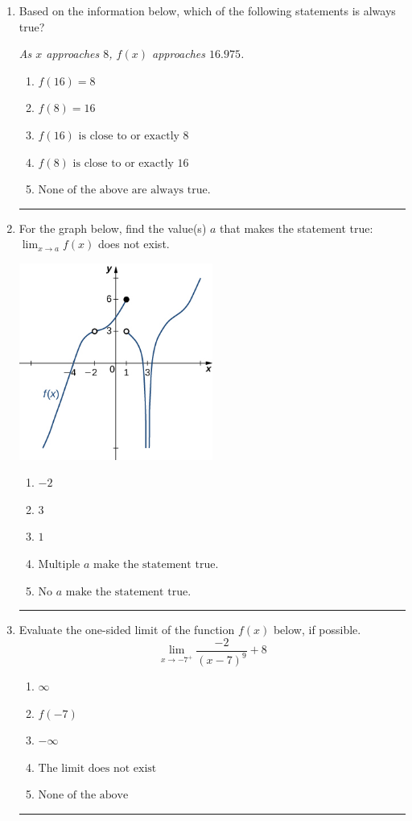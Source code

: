 \documentclass[14pt]{extbook}
\newcommand{\litem}[1]{\item#1\hspace*{-1cm}\rule{\textwidth}{0.4pt}}
\begin{document}
\begin{enumerate}
{\begin{enumerate}[label=\Alph*.]
\end{enumerate} }
\litem{
Based on the information below, which of the following statements is always true?
\begin{center}
    \textit{ As $x$ approaches $8$, $f(x)$ approaches $16.975$. }
\end{center}
\begin{enumerate}[label=\Alph*.]
\item \( f(16) = 8 \)
\item \( f(8) = 16 \)
\item \( f(16) \text{ is close to or exactly } 8 \)
\item \( f(8) \text{ is close to or exactly } 16 \)
\item \( \text{None of the above are always true.} \)

\end{enumerate} }
\litem{
For the graph below, find the value(s) $a$ that makes the statement true: $ \displaystyle \lim_{x \rightarrow a} f(x)$ does not exist.
\begin{center}
    \includegraphics[width=0.5\textwidth]{../Figures/evaluateLimitGraphicallyC.png}
\end{center}
\begin{enumerate}[label=\Alph*.]
\item \( -2 \)
\item \( 3 \)
\item \( 1 \)
\item \( \text{Multiple } a \text{ make the statement true}. \)
\item \( \text{No } a \text{ make the statement true}. \)

\end{enumerate} }
\litem{
Evaluate the one-sided limit of the function $f(x)$ below, if possible.\[ \lim_{x \rightarrow -7^+} \frac{-2}{(x-7)^9}+8 \]\begin{enumerate}[label=\Alph*.]
\item \( \infty \)
\item \( f(-7) \)
\item \( -\infty \)
\item \( \text{The limit does not exist} \)
\item \( \text{None of the above} \)


\end{enumerate}}
\end{enumerate}
\end{document}
